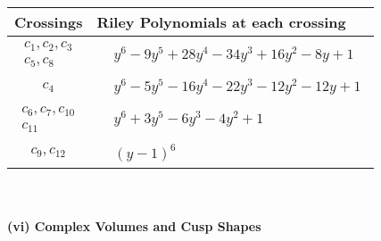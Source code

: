 \documentclass[1p]{elsarticle_modified}
\theoremstyle{definition}
\begin{document}
\begin{tabular}{m{50pt}|m{274pt}}
Crossings & \hspace{64pt}Riley Polynomials at each crossing \\
\hline $$\begin{aligned}c_{1},c_{2},c_{3}\\c_{5},c_{8}\end{aligned}$$&$\begin{aligned}
&y^6-9 y^5+28 y^4-34 y^3+16 y^2-8 y+1
\end{aligned}$\\
\hline $$\begin{aligned}c_{4}\end{aligned}$$&$\begin{aligned}
&y^6-5 y^5-16 y^4-22 y^3-12 y^2-12 y+1
\end{aligned}$\\
\hline $$\begin{aligned}c_{6},c_{7},c_{10}\\c_{11}\end{aligned}$$&$\begin{aligned}
&y^6+3 y^5-6 y^3-4 y^2+1
\end{aligned}$\\
\hline $$\begin{aligned}c_{9},c_{12}\end{aligned}$$&$\begin{aligned}
&(y-1)^6
\end{aligned}$\\
\hline
\end{tabular}\\~\\
\newpage\flushleft \textbf{(vi) Complex Volumes and Cusp Shapes}
\end{document}

